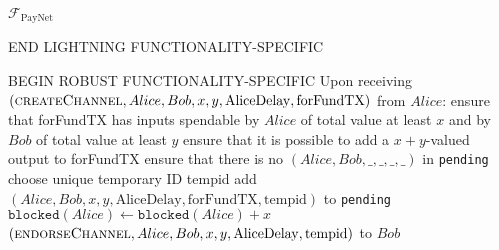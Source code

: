 \begin{functionality}{$\mathcal{F}_{\mathrm{PayNet}}$}
\begin{algorithmic}[1]
    \State END LIGHTNING FUNCTIONALITY-SPECIFIC

    \State BEGIN ROBUST FUNCTIONALITY-SPECIFIC
    \State Upon receiving $\left(\textsc{createChannel}, Alice, Bob, x, y,
    \mathrm{AliceDelay}, \mathrm{forFundTX}\right)$ from $Alice$:
    \Indent
      \State ensure that forFundTX has inputs spendable by $Alice$ of total
      value at least $x$ and by $Bob$ of total value at least $y$
      \State ensure that it is possible to add a $x + y$-valued output to
      forFundTX
      \State ensure that there is no $\left(Alice, Bob, \_, \_, \_, \_\right)$
      in \texttt{pending}
      \State choose unique temporary ID tempid
      \State add $\left(Alice, Bob, x, y, \mathrm{AliceDelay},
      \mathrm{forFundTX}, \mathrm{tempid}\right)$ to \texttt{pending}
      \State $\mathtt{blocked}\left(Alice\right) \leftarrow
      \mathtt{blocked}\left(Alice\right) + x$
      \State \Return $\left(\textsc{endorseChannel}, Alice, Bob, x, y,
      \mathrm{AliceDelay}, \mathrm{tempid}\right)$ to $Bob$ 
    \EndIndent
    \State


\end{algorithmic}
\end{functionality}
